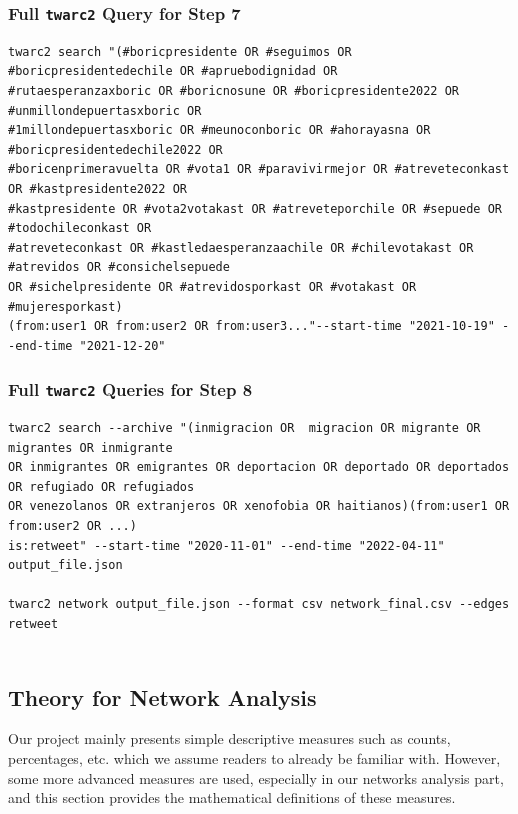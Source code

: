  
      \subsubsection{Full \texttt{twarc2} Query for Step 7}\label{appsec_twarc_query7}
        \begin{verbatim}
twarc2 search "(#boricpresidente OR #seguimos OR #boricpresidentedechile OR #apruebodignidad OR 
#rutaesperanzaxboric OR #boricnosune OR #boricpresidente2022 OR #unmillondepuertasxboric OR 
#1millondepuertasxboric OR #meunoconboric OR #ahorayasna OR #boricpresidentedechile2022 OR 
#boricenprimeravuelta OR #vota1 OR #paravivirmejor OR #atreveteconkast OR #kastpresidente2022 OR 
#kastpresidente OR #vota2votakast OR #atreveteporchile OR #sepuede OR #todochileconkast OR 
#atreveteconkast OR #kastledaesperanzaachile OR #chilevotakast OR #atrevidos OR #consichelsepuede 
OR #sichelpresidente OR #atrevidosporkast OR #votakast OR #mujeresporkast)
(from:user1 OR from:user2 OR from:user3..."--start-time "2021-10-19" --end-time "2021-12-20"
        \end{verbatim}
        
         \subsubsection{Full \texttt{twarc2} Queries for Step 8}\label{appsec_twarc_query8}
        \begin{verbatim}
twarc2 search --archive "(inmigracion OR  migracion OR migrante OR migrantes OR inmigrante 
OR inmigrantes OR emigrantes OR deportacion OR deportado OR deportados OR refugiado OR refugiados 
OR venezolanos OR extranjeros OR xenofobia OR haitianos)(from:user1 OR from:user2 OR ...) 
is:retweet" --start-time "2020-11-01" --end-time "2022-04-11" output_file.json

twarc2 network output_file.json --format csv network_final.csv --edges retweet


        \end{verbatim}  
   
    
    \subsection{Theory for Network Analysis}\label{appsec_theory}\label{appsec_theory_net}
    Our project mainly presents simple descriptive measures such as counts, percentages, etc. which we assume readers to already be familiar with. However, some more advanced measures are used, especially in our networks analysis part, and this section provides the mathematical definitions of these measures. %

